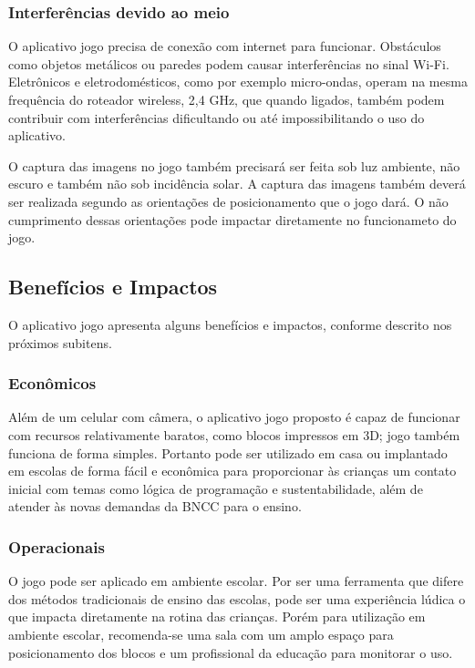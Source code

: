         \subsubsection{Interferências devido ao meio}
        O aplicativo jogo precisa de conexão com internet para funcionar. Obstáculos como objetos metálicos ou paredes podem causar interferências no sinal Wi-Fi. Eletrônicos e eletrodomésticos, como por exemplo micro-ondas, operam na mesma frequência do roteador wireless, 2,4 GHz, que quando ligados, também podem contribuir com interferências dificultando ou até impossibilitando o uso do aplicativo.
        
        O captura das imagens no jogo também precisará ser feita sob luz ambiente, não escuro e também não sob incidência solar. A captura das imagens também deverá ser realizada segundo as orientações de posicionamento que o jogo dará. O não cumprimento dessas orientações pode impactar diretamente no funcionameto do jogo.
    
    \subsection{Benefícios e Impactos}
    O aplicativo jogo apresenta alguns benefícios e impactos, conforme descrito nos próximos subitens.

        \subsubsection{Econômicos}
        Além de um celular com câmera, o aplicativo jogo proposto é capaz de funcionar com recursos relativamente baratos, como blocos impressos em 3D; jogo também funciona de forma simples. Portanto pode ser utilizado em casa ou implantado em escolas de forma fácil e econômica para proporcionar às crianças um contato inicial com temas como lógica de programação e sustentabilidade, além de atender às novas demandas da BNCC para o ensino.
        
        \subsubsection{Operacionais}
        O jogo pode ser aplicado em ambiente escolar. Por ser uma ferramenta que difere dos métodos tradicionais de ensino das escolas, pode ser uma experiência lúdica o que impacta diretamente na rotina das crianças. Porém para utilização em ambiente escolar, recomenda-se uma sala com um amplo espaço para posicionamento dos blocos e um profissional da educação para monitorar o uso.
        
